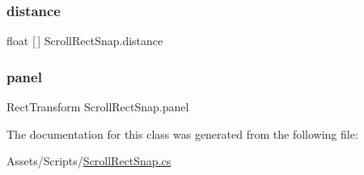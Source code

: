 \mbox{\label{classScrollRectSnap_a6956e26eab23ba0e943fc31ebfc48b9e}} 
\subsubsection{\texorpdfstring{distance}{distance}}
{\footnotesize\ttfamily float \mbox{[}$\,$\mbox{]} Scroll\+Rect\+Snap.\+distance}

\mbox{\label{classScrollRectSnap_a79161928f3a343aa90dd4d552bf7a7d7}} 
\subsubsection{\texorpdfstring{panel}{panel}}
{\footnotesize\ttfamily Rect\+Transform Scroll\+Rect\+Snap.\+panel}



The documentation for this class was generated from the following file\+:\begin{DoxyCompactItemize}
\item 
Assets/\+Scripts/\hyperlink{ScrollRectSnap_8cs}{Scroll\+Rect\+Snap.\+cs}\end{DoxyCompactItemize}
